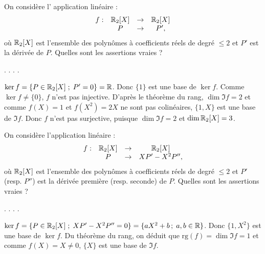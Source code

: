 \begin{question}
On considère l' application linéaire : 
$$\begin{array}{rccc}f:&\mathbb{R}_2[X]&\to&\mathbb{R}_2[X]\\
& P&\to &P',  \end{array}$$
où $\mathbb{R}_2[X]$ est l'ensemble des polynômes à coefficients réels de degré $\le 2$ et $P'$ est la dérivée de $P$. Quelles sont les assertions vraies ?
\begin{answers}  
.
.
.
.
\end{answers}
\begin{explanations} $\ker f = \{P \in \mathbb{R}_2[X] \; ; \; P'=0\} = \mathbb{R}$. Donc $ \{1\}$ est une base de $\ker f$. Comme $\ker f \neq \{0\}$, $f$ n'est pas injective.
\vskip0mm
D'après le théorème du rang, $\dim \Im f = 2 $ et comme $f(X)=1$ et $ f(X^2) = 2X$ ne sont pas colinéaires, $\{1,X\}$ est une base de  $\Im f$. Donc $f$ n'est pas surjective, puisque $\dim \Im f = 2 $ et 
$\dim \mathbb{R}_2[X] =3 $.
\end{explanations}
\end{question}

\begin{question}
On considère l'application linéaire : 
$$\begin{array}{rccc}f:&\mathbb{R}_2[X]&\to&\mathbb{R}_2[X]\\
& P&\to &XP'-X^2P'',  \end{array}$$
où $\mathbb{R}_2[X]$ est l'ensemble des polynômes à coefficients réels de degré $\le 2$ et $P'$ (resp. $P''$) est la dérivée première (resp. seconde) de $P$. Quelles sont les assertions vraies ?
\begin{answers}  
.
.
.
.
\end{answers}
\begin{explanations}  $\ker f=\{P \in \mathbb{R}_2[X] \; ; \; XP'-X^2P''=0\}=\{aX^2+b \, ; \; a,b\in \mathbb{R}\}$. Donc $\{1,X^2\}$ est une base de $\ker f$. Du théorème du rang, on déduit que $\mbox{rg}(f)=\dim \Im f=1 $ et comme $f(X)=X\neq 0$, $\{X\}$ est une base de $\Im f$. 
\end{explanations}
\end{question}

